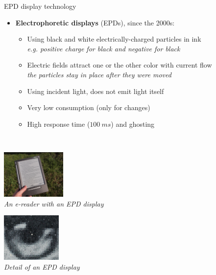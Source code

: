\begin{frame}{EPD display technology}
  \begin{itemize}
  \item \textbf{Electrophoretic displays} (EPDs), since the 2000s:
    \begin{itemize}
    \item Using black and white electrically-charged particles in ink\\
    \textit{e.g. positive charge for black and negative for black}
    \item Electric fields attract one or the other color with current flow\\
    \textit{the particles stay in place after they were moved}
    \item Using incident light, does not emit light itself
    \item Very low consumption (only for changes)
    \item High response time (\(100~ms\)) and ghosting
    \end{itemize}
  \end{itemize}~

  \begin{minipage}[b]{0.45\textwidth}
    \centering
    \includegraphics[height=6.5em]{slides/graphics-hardware/e-reader.jpg}\\
    \textit{\small An e-reader with an EPD display}
  \end{minipage}
  \hfill
  \begin{minipage}[b]{0.45\textwidth}
    \centering
    \includegraphics[height=6.5em]{slides/graphics-hardware/epd-detail.jpg}\\
    \textit{\small Detail of an EPD display}
  \end{minipage}
\end{frame}

